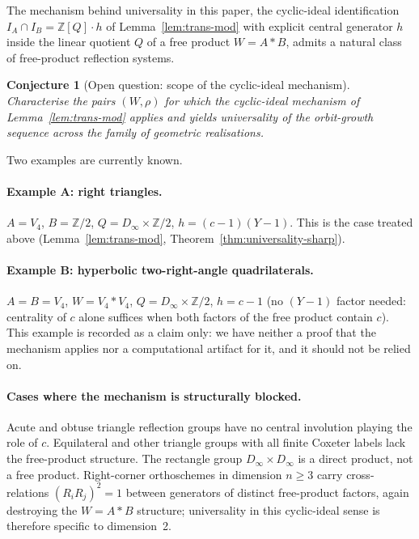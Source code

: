 \documentclass[11pt]{article}
\theoremstyle{plain}
\newtheorem{conjecture}[theorem]{Conjecture}
\theoremstyle{definition}
\theoremstyle{remark}
\begin{document}
The mechanism behind universality in this paper, the cyclic-ideal
identification $I_A \cap I_B = \mathbb{Z}[Q]\cdot h$ of
Lemma~\ref{lem:trans-mod} with explicit central generator $h$ inside the
linear quotient $Q$ of a free product $W = A * B$, admits a natural class of
free-product reflection systems.

\begin{conjecture}[Open question: scope of the cyclic-ideal mechanism]
\label{conj:universality-class}
Characterise the pairs $(W, \rho)$ for which the cyclic-ideal mechanism
of Lemma~\ref{lem:trans-mod} applies and yields universality of
the orbit-growth sequence across the family of geometric realisations.
\end{conjecture}

Two examples are currently known.

\paragraph{Example A: right triangles.}  $A = V_4$, $B = \mathbb{Z}/2$,
$Q = D_\infty \times \mathbb{Z}/2$, $h = (c-1)(Y-1)$.  This is the case
treated above (Lemma~\ref{lem:trans-mod},
Theorem~\ref{thm:universality-sharp}).

\paragraph{Example B: hyperbolic two-right-angle quadrilaterals.}
$A = B = V_4$, $W = V_4 * V_4$, $Q = D_\infty \times \mathbb{Z}/2$,
$h = c - 1$ (no $(Y-1)$ factor needed: centrality of $c$ alone suffices
when both factors of the free product contain $c$). This example is
recorded as a claim only: we have neither a proof that the mechanism
applies nor a computational artifact for it, and it should not be relied
on.

\paragraph{Cases where the mechanism is structurally blocked.}  Acute
and obtuse triangle reflection groups have no central involution
playing the role of $c$.  Equilateral and other triangle groups with
all finite Coxeter labels lack the free-product structure.  The
rectangle group $D_\infty \times D_\infty$ is a direct product, not a
free product.  Right-corner orthoschemes in dimension $n \ge 3$ carry
cross-relations $(R_i R_j)^2 = 1$ between generators of distinct
free-product factors, again destroying the $W = A * B$ structure;
universality in this cyclic-ideal sense is therefore specific to
dimension~2.
\end{document}
